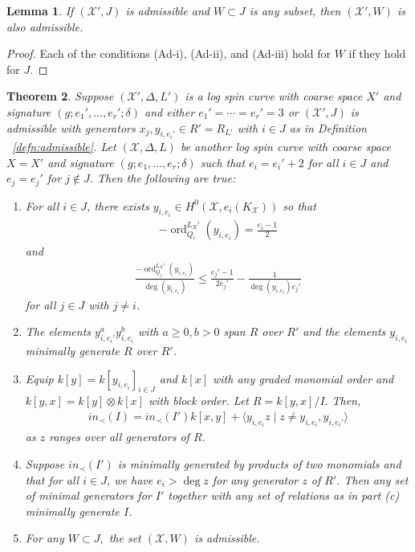 \documentclass{amsart}
\theoremstyle{plain}
\newtheorem{thm}{Theorem}[section]
\newtheorem{lem}[thm]{Lemma}
\theoremstyle{definition}
\theoremstyle{remark}
\numberwithin{equation}{section}
\newcommand \sx{\mathscr X}
\DeclareMathOperator{\ord}{ord}
\newcommand \subhalf[1]{\frac{{#1} - 1}{2{#1}}}
\newcommand \halfcan{L}
\begin{document}
\begin{lem}
\label{lem:admissible_subset}
If $(\sx', J)$ is admissible and $W \subset J$ is any subset,
then $(\sx', W)$ is also admissible.
\end{lem}

\begin{proof}
Each of the conditions (Ad-i), (Ad-ii), and (Ad-iii) hold for $W$
if they hold for $J$.
\end{proof}

\begin{thm}
\label{thm:ram_order_ind}
Suppose $(\sx', \Delta, \halfcan')$  is a log spin curve with coarse
space $X'$ and signature $(g; e_1', \ldots, e_r'; \delta)$ and either $e_1' = \cdots = e_r' = 3$ or $(\sx',J)$ is admissible with generators $x_j, y_{i, e_i'} \in R' =
R_{L'}$ with $i \in J$ as in Definition ~\ref{defn:admissible}. Let
$(\sx, \Delta, \halfcan)$ be another log spin curve
with coarse space $X = X'$ and signature $(g; e_1, \ldots, e_r;
\delta)$ such that $e_i = e_i' + 2$ for all $i \in J$ and
$e_j = e_j'$ for $j \notin J$. Then the following are true:
\begin{enumerate}
	\item[(a)] For all $i \in J$, there exists $y_{i, e_i} \in
		H^0(\sx, e_i(K_\sx))$ so that
		\begin{align*}
			-\ord_{Q_i}
^{\halfcan_X'}(y_{i, e_i}) = \frac{e_i - 1}{2}
		\end{align*}
		and
		\begin{align*}
			\frac{-\ord_{Q_j}
^{\halfcan_X'}(y_{i, e_i})}{\deg (y_{i, e_i})} \leq 
\subhalf{
			e_j'} - \frac{1}{\deg(y_{i, e_i})e_j'}
		\end{align*}
		for all $j \in J$ with $j \neq i$.
	\item[(b)] The elements $y_{i, e_i'}^a y_{i, e_i}^b$ with $a \geq 
0,
		b > 0$ span $R$ over $R'$ and the elements $y_{i, e_i}$ minimally
		generate $R$ over $R'$.
	\item[(c)] Equip $k[y] = k[y_{i, e_i}]_{i \in J}$ and $k[x]$ with
		any graded monomial order and $k[y, x] = k[y] \otimes k[x]$ with
		block order. Let $R = k[y, x]/I.$ Then,
		\begin{align*}
			in_\prec(I) = in_\prec(I')k[x, y] + \langle y_{i, e_i}z \mid z 
			\neq y_{i, e_i}, y_{i, e_i'} \rangle
		\end{align*}
		as $z$ ranges over all generators of $R$.
	\item[(d)] Suppose $in_\prec(I')$ is minimally generated by
		products of two monomials and that for all $i \in J$, we have $e
		_i > \deg z$ for any generator $z$ of $R'.$ Then any set of
		minimal generators for $I'$ together with any set of relations 
as in 
		part (c) minimally generate $I$.
	\item[(e)] For any $W \subset J,$ the set $(\sx,W)$ is admissible.
\end{enumerate}
\end{thm}
\end{document}
